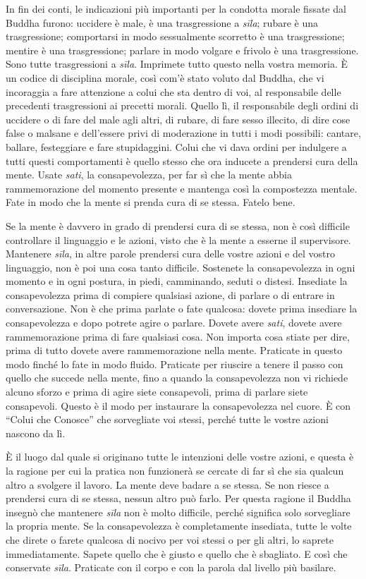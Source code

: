 In fin dei conti, le indicazioni più importanti per la condotta morale
fissate dal Buddha furono: uccidere è male, è una trasgressione a
\emph{sīla}; rubare è una trasgressione; comportarsi in modo
sessualmente scorretto è una trasgressione; mentire è una trasgressione;
parlare in modo volgare e frivolo è una trasgressione. Sono tutte
trasgressioni a \emph{sīla}. Imprimete tutto questo nella vostra
memoria. È un codice di disciplina morale, così com'è stato voluto dal
Buddha, che vi incoraggia a fare attenzione a colui che sta dentro di
voi, al responsabile delle precedenti trasgressioni ai precetti morali.
Quello lì, il responsabile degli ordini di uccidere o di fare del male
agli altri, di rubare, di fare sesso illecito, di dire cose false o
malsane e dell'essere privi di moderazione in tutti i modi possibili:
cantare, ballare, festeggiare e fare stupidaggini. Colui che vi dava
ordini per indulgere a tutti questi comportamenti è quello stesso che
ora inducete a prendersi cura della mente. Usate \emph{sati}, la
consapevolezza, per far sì che la mente abbia rammemorazione del momento
presente e mantenga così la compostezza mentale. Fate in modo che la
mente si prenda cura di se stessa. Fatelo bene.

Se la mente è davvero in grado di prendersi cura di se stessa, non è
così difficile controllare il linguaggio e le azioni, visto che è la
mente a esserne il supervisore. Mantenere \emph{sīla}, in altre parole
prendersi cura delle vostre azioni e del vostro linguaggio, non è poi
una cosa tanto difficile. Sostenete la consapevolezza in ogni momento e
in ogni postura, in piedi, camminando, seduti o distesi. Insediate la
consapevolezza prima di compiere qualsiasi azione, di parlare o di
entrare in conversazione. Non è che prima parlate o fate qualcosa:
dovete prima insediare la consapevolezza e dopo potrete agire o parlare.
Dovete avere \emph{sati}, dovete avere rammemorazione prima di fare
qualsiasi cosa. Non importa cosa stiate per dire, prima di tutto dovete
avere rammemorazione nella mente. Praticate in questo modo finché lo
fate in modo fluido. Praticate per riuscire a tenere il passo con quello
che succede nella mente, fino a quando la consapevolezza non vi richiede
alcuno sforzo e prima di agire siete consapevoli, prima di parlare siete
consapevoli. Questo è il modo per instaurare la consapevolezza nel
cuore. È con ``Colui che Conosce'' che sorvegliate voi stessi, perché
tutte le vostre azioni nascono da lì.

È il luogo dal quale si originano tutte le intenzioni delle vostre
azioni, e questa è la ragione per cui la pratica non funzionerà se
cercate di far sì che sia qualcun altro a svolgere il lavoro. La mente
deve badare a se stessa. Se non riesce a prendersi cura di se stessa,
nessun altro può farlo. Per questa ragione il Buddha insegnò che
mantenere \emph{sīla} non è molto difficile, perché significa solo
sorvegliare la propria mente. Se la consapevolezza è completamente
insediata, tutte le volte che direte o farete qualcosa di nocivo per voi
stessi o per gli altri, lo saprete immediatamente. Sapete quello che è
giusto e quello che è sbagliato. E così che conservate \emph{sīla}.
Praticate con il corpo e con la parola dal livello più basilare.

